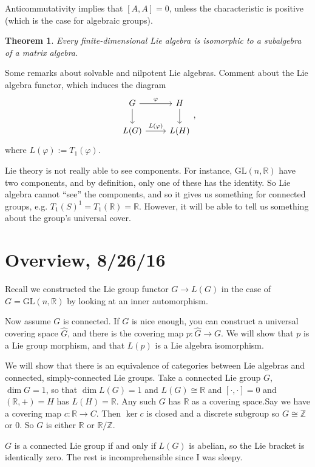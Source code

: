 \documentclass[letterpaper, 12pt]{article}
\newtheorem{thm}{Theorem}[subsection]
\newcommand{\iso}{\cong}
\newcommand{\reals}{\mathbb{R}}
\newcommand{\Z}{\mathbb{Z}}
\newcommand{\Tone}{T_1}
\newcommand{\T}[1]{\Tone(#1)}
\newcommand{\csq}[9]{\[
	\begin{tikzcd}[ampersand replacement=\&]
	{#1} \arrow{r}{#5} \arrow{d}{#6}
		\& {#2} \arrow{d}{#7} \\
	{#3} \arrow{r}{#8}
		\& {#4}
	\end{tikzcd}
#9\]}
\newcommand{\gl}[2]{\mathrm{GL}(#1, #2)}
\begin{document}
Anticommutativity implies that $[A, A] = 0$, unless the characteristic is
positive (which is the case for algebraic groups).

\begin{thm} Every finite-dimensional Lie algebra is isomorphic to a subalgebra
of a matrix algebra. \end{thm}

Some remarks about solvable and nilpotent Lie algebras. Comment about the Lie
algebra functor, which induces the diagram \csq G H {L(G)} {L(H)} \varphi {}
{} {L(\varphi)}, where $L(\varphi) := \T \varphi$.
 
Lie theory is not really able to see components. For instance, $\gl n \reals$
have two components, and by definition, only one of these has the identity. So
Lie algebra cannot ``see'' the components, and so it gives us something for
connected groups, e.g. $\T S^1 = \T \reals = \reals.$ However, it will be able
to tell us something about the group's universal cover.

\section{Overview, 8/26/16}
Recall we constructed the Lie group functor $G \rightarrow L(G)$ in the case of $G = \gl n \reals$ by looking at an inner automorphism.

Now assume $G$ is connected. If $G$ is nice enough, you can construct a universal covering space $\hat{G}$, and there is the covering map $p: \hat{G} \rightarrow G$. We will show that $p$ is a Lie group morphism, and that $L(p)$ is a Lie algebra isomorphism.

We will show that there is an equivalence of categories between Lie algebras and connected, simply-connected Lie groups. Take a connected Lie group $G$, $\dim G = 1$, so that $\dim L(G) = 1$ and $L(G) \iso \reals$ and $[ \cdot, \cdot ] = 0$ and $(\reals, +) = H$ has $L(H) = \reals$. Any such $G$ has $\reals$ as a covering space.Say we have a covering map $c: \reals \rightarrow C$. Then $\ker c$ is closed and a discrete subgroup so $G \iso \Z$ or $0$. So $G$ is either $\reals$ or $\reals/\Z$.

$G$ is a connected Lie group if and only if $L(G)$ is abelian, so the Lie bracket is identically zero. The rest is incomprehensible since I was sleepy.
\end{document}

